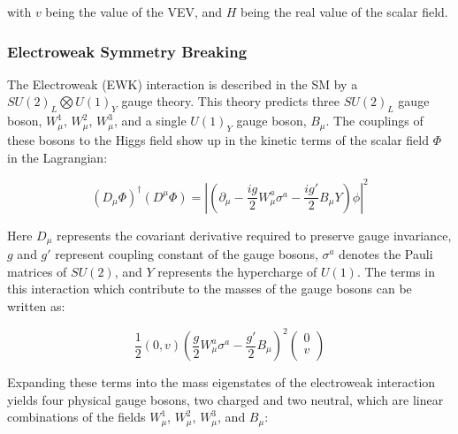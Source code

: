 with $v$ being the value of the VEV, and $H$ being the real value of the scalar field. 

\subsubsection{Electroweak Symmetry Breaking}
\label{sec:EWKbreaking}

The Electroweak (EWK) interaction is described in the SM by a $SU(2)_L\bigotimes U(1)_Y$ gauge theory. This theory predicts three $SU(2)_L$ gauge boson, $W^1_\mu$, $W^2_\mu$, $W^3_\mu$, and a single $U(1)_Y$ gauge boson, $B_\mu$. The couplings of these bosons to the Higgs field show up in the kinetic terms of the scalar field $\Phi$ in the Lagrangian:

\begin{equation}
  \label{eq:Lphi}
  (D_\mu\Phi)^\dagger(D^\mu\Phi) = |(\partial_\mu - \frac{ig}{2}W^a_\mu\sigma^a - \frac{ig'}{2}B_\mu Y)\phi|^2
\end{equation}

Here $D_\mu$ represents the covariant derivative required to preserve gauge invariance, $g$ and $g'$ represent coupling constant of the gauge bosons, $\sigma^a$ denotes the Pauli matrices of $SU(2)$, and $Y$ represents the hypercharge of $U(1)$. The terms in this interaction which contribute to the masses of the gauge bosons can be written as:

\begin{equation}
  \label{eq:LVEV}
  \frac{1}{2}(0,v)(\frac{g}{2}W^a_\mu\sigma^a - \frac{g'}{2}B_\mu)^2
  \begin{pmatrix}                                                                                                                               
    0 \\                                                                                                                                        
    v \\                                                                                                                                        
  \end{pmatrix}
\end{equation}

Expanding these terms into the mass eigenstates of the electroweak interaction yields four physical gauge bosons, two charged and two neutral, which are linear combinations of the fields $W^1_\mu$, $W^2_\mu$, $W^3_\mu$, and $B_\mu$:

